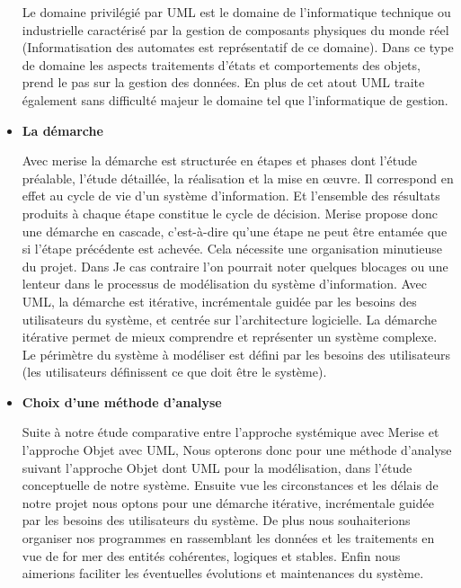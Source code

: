 \begin{itemize}
	      Le domaine privilégié par UML est le domaine de l’informatique technique ou industrielle
	      caractérisé par la gestion de composants physiques du monde réel (Informatisation des automates
	      est représentatif de ce domaine). Dans ce type de domaine les aspects traitements d’états et
	      comportements des objets, prend le pas sur la gestion des données. En plus de cet atout UML
	      traite également sans difficulté majeur le domaine tel que l’informatique de gestion.

	\item \textbf{La démarche}

	      Avec merise la démarche est structurée en étapes et phases dont l’étude préalable, l’étude
	      détaillée, la réalisation et la mise en œuvre. Il correspond en effet au cycle de vie d’un système
	      d’information. Et l’ensemble des résultats produits à chaque étape constitue le cycle de décision.
	      Merise propose donc une démarche en cascade, c’est-à-dire qu’une étape ne peut être entamée
	      que si l’étape précédente est achevée. Cela nécessite une organisation minutieuse du projet.
	      Dans Je cas contraire l’on pourrait noter quelques blocages ou une lenteur dans le processus
	      de modélisation du système d’information. Avec UML, la démarche est itérative, incrémentale
	      guidée par les besoins des utilisateurs du système, et centrée sur l’architecture logicielle. La
	      démarche itérative permet de mieux comprendre et représenter un système complexe. Le
	      périmètre du système à modéliser est défini par les besoins des utilisateurs (les utilisateurs
	      définissent ce que doit être le système).

	\item \textbf{Choix d’une méthode d’analyse}

	      Suite à notre étude comparative entre l’approche systémique avec Merise et l’approche Objet
	      avec UML, Nous opterons donc pour une méthode d’analyse suivant l’approche Objet dont UML
	      pour la modélisation, dans l’étude conceptuelle de notre système. Ensuite vue les circonstances
	      et les délais de notre projet nous optons pour une démarche itérative, incrémentale guidée par
	      les besoins des utilisateurs du système. De plus nous souhaiterions organiser nos programmes
	      en rassemblant les données et les traitements en vue de for mer des entités cohérentes, logiques
	      et stables. Enfin nous aimerions faciliter les éventuelles évolutions et maintenances du système.
\end{itemize}

